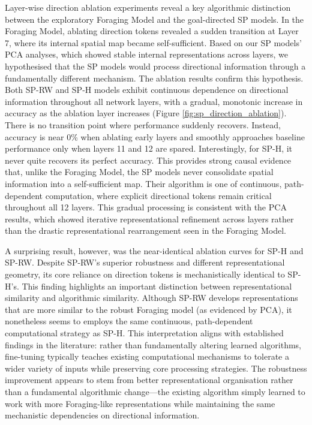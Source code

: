Layer-wise direction ablation experiments reveal a key algorithmic distinction between the exploratory Foraging Model and the goal-directed SP models. In the Foraging Model, ablating direction tokens revealed a sudden transition at Layer 7, where its internal spatial map became self-sufficient. Based on our SP models' PCA analyses, which showed stable internal representations across layers, we hypothesised that the SP models would process directional information through a fundamentally different mechanism. The ablation results confirm this hypothesis. Both SP-RW and SP-H models exhibit continuous dependence on directional information throughout all network layers, with a gradual, monotonic increase in accuracy as the ablation layer increases (Figure \ref{fig:sp_direction_ablation}). There is no transition point where performance suddenly recovers. Instead, accuracy is near 0\% when ablating early layers and smoothly approaches baseline performance only when layers 11 and 12 are spared. Interestingly, for SP-H, it never quite recovers its perfect accuracy. This provides strong causal evidence that, unlike the Foraging Model, the SP models never consolidate spatial information into a self-sufficient map. Their algorithm is one of continuous, path-dependent computation, where explicit directional tokens remain critical throughout all 12 layers. This gradual processing is consistent with the PCA results, which showed iterative representational refinement across layers rather than the drastic representational rearrangement seen in the Foraging Model.

A surprising result, however, was the near-identical ablation curves for SP-H and SP-RW. Despite SP-RW's superior robustness and different representational geometry, its core reliance on direction tokens is mechanistically identical to SP-H's. This finding highlights an important distinction between representational similarity and algorithmic similarity. Although SP-RW develops representations that are more similar to the robust Foraging model (as evidenced by PCA), it nonetheless seems to employs the same continuous, path-dependent computational strategy as SP-H. This interpretation aligns with established findings in the literature: rather than fundamentally altering learned algorithms, fine-tuning typically teaches existing computational mechanisms to tolerate a wider variety of inputs while preserving core processing strategies. The robustness improvement appears to stem from better representational organisation rather than a fundamental algorithmic change—the existing algorithm simply learned to work with more Foraging-like representations while maintaining the same mechanistic dependencies on directional information. 

